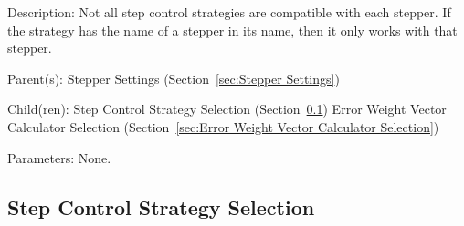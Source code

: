 \begin{list}{}
  {\setlength{\leftmargin}{1.0in}
   \setlength{\labelwidth}{0.75in}
   \setlength{\labelsep}{0.125in}}
  \item[Description:]
    Not all step control strategies are compatible with each stepper.  If the strategy has the name of a stepper in its name, then it only works with that stepper.
  \item[Parent(s):]
    Stepper Settings (Section~\ref{sec:Stepper Settings})
  \item[Child(ren):]
    Step Control Strategy Selection (Section~\ref{sec:Step Control Strategy Selection})
      \newline 
    Error Weight Vector Calculator Selection (Section~\ref{sec:Error Weight Vector Calculator Selection})
  \item[Parameters:]
    None. 
\end{list}

\subsection{Step Control Strategy Selection}
\label{sec:Step Control Strategy Selection}

